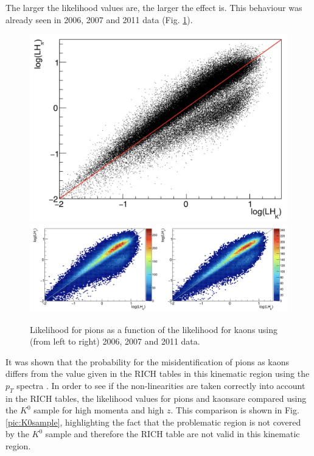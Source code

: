 The larger the likelihood values are, the larger the effect is. This behaviour was already seen in 2006, 2007 and 2011 data (Fig. \ref{pic:NonLinother}).

\begin{figure}[!h]
  \centering
	\includegraphics[scale=0.2]{./gfx/RICHLH2006.png}
  \includegraphics[scale=0.3]{./gfx/RICHLH2011.png}
	\caption{Likelihood for pions as a function of the likelihood for kaons using (from left to right) 2006, 2007 and 2011 data.}
	\label{pic:NonLinother}
\end{figure}

It was shown that the probability for the misidentification of pions as kaons differs from the value given in the RICH tables in this kinematic region using the $p_T$ spectra \cite{MarcinNote}. In order to see if the non-linearities are taken correctly into account in the RICH tables, the likelihood values for pions and kaonsare compared using the $K^0$ sample for high momenta and high $z$. This comparison is shown in Fig. \ref{pic:K0sample}, highlighting the fact that the problematic region is not covered by the $K^0$ sample and therefore the RICH table are not valid in this kinematic region.

